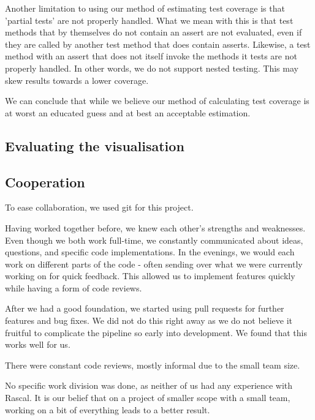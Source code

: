 \documentclass{article}
\begin{document}
Another limitation to using our method of estimating test coverage is that 'partial tests' are not properly handled. What we mean with this is that test methods that by themselves do not contain an assert are not evaluated, even if they are called by another test method that does contain asserts. Likewise, a test method with an assert that does not itself invoke the methods it tests are not properly handled.
In other words, we do not support nested testing. This may skew results towards a lower coverage.

We can conclude that while we believe our method of calculating test coverage is at worst an educated guess and at best an acceptable estimation.

\subsection{Evaluating the visualisation}

\subsection{Cooperation}
To ease collaboration, we used git for this project.

Having worked together before, we knew each other's strengths and weaknesses. Even though we both work full-time, we constantly communicated about ideas, questions, and specific code implementations. 
In the evenings, we would each work on different parts of the code - often sending over what we were currently working on for quick feedback. This allowed us to implement features quickly while having a form of code reviews.

After we had a good foundation, we started using pull requests for further features and bug fixes. We did not do this right away as we do not believe it fruitful to complicate the pipeline so early into development. We found that this works well for us.

There were constant code reviews, mostly informal due to the small team size.

No specific work division was done, as neither of us had any experience with Rascal. It is our belief that on a project of smaller scope with a small team, working on a bit of everything leads to a better result.




\clearpage
\appendix
\appendixpage{}
\end{document}
